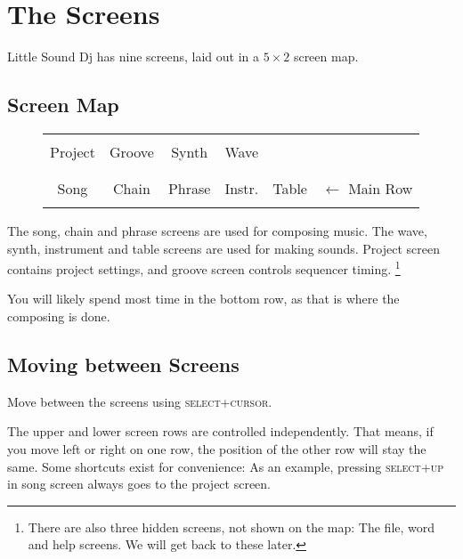 \chapter{The Screens}
Little Sound Dj has nine screens, laid out in a \begin{math} 5 \times 2 \end{math} screen map.

\section{Screen Map}

\begin{figure}[htbp]
\centering
\begin{tabular}{|c|c|c|c|c|l}
	\cline{0-3}
    & & & \\
    Project & Groove & Synth & Wave \\
    & & & \\
	\cline{0-4}
	& & & & & \\
	Song & Chain & Phrase & Instr. & Table  & \begin{math} \leftarrow \end{math} Main Row \\
	& & & & & \\
	\cline{0-4}
\end{tabular}
\end{figure}

The song, chain and phrase screens are used for composing music. The wave, synth,
instrument and table screens are used for making sounds.
Project screen contains project settings, and groove screen controls sequencer timing.
\footnote{There are also three hidden
screens, not shown on the map: The file, word and help screens. We will get back to these later.}

You will likely spend most time in the bottom row, as that is where the composing is done.

\section{Moving between Screens}

Move between the screens using \textsc{select+cursor}.

The upper and lower screen rows are controlled independently. That means, if you move
left or right on one row, the position of the other row will stay the same.
Some shortcuts exist for convenience: As an example, pressing \textsc{select+up}
in song screen always goes to the project screen.

